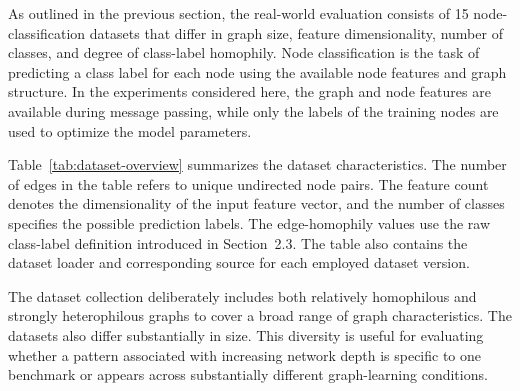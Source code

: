 \documentclass[english]{lni}
\begin{document}
As outlined in the previous section, the real-world evaluation consists of 15 node-classification datasets that differ in graph size, feature dimensionality, number of classes, and degree of class-label homophily. Node classification is the task of predicting a class label for each node using the available node features and graph structure. In the experiments considered here, the graph and node features are available during message passing, while only the labels of the training nodes are used to optimize the model parameters.

Table~\ref{tab:dataset-overview} summarizes the dataset characteristics. The number of edges in the table refers to unique undirected node pairs. The feature count denotes the dimensionality of the input feature vector, and the number of classes specifies the possible prediction labels. The edge-homophily values use the raw class-label definition introduced in Section~2.3. The table also contains the dataset loader and corresponding source for each employed dataset version.

The dataset collection deliberately includes both relatively homophilous and strongly heterophilous graphs to cover a broad range of graph characteristics. The datasets also differ substantially in size. This diversity is useful for evaluating whether a pattern associated with increasing network depth is specific to one benchmark or appears across substantially different graph-learning conditions.
\end{document}
